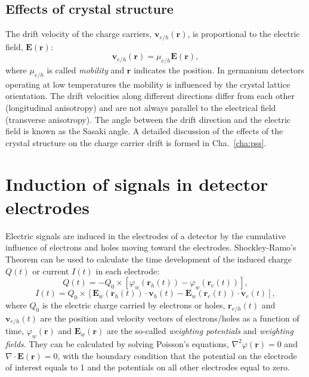 \subsection{Effects of crystal structure}
\label{sec:det:struc}
The drift velocity of the charge carriers, $\mathbf{v}_{e/h}(\mathbf{r})$, is proportional to the electric field, $\mathbf{E}(\mathbf{r})$:
\begin{equation} 
\label{eq:det:dv}
\mathbf{v}_{e/h} (\mathbf{r})= \mu_{e/h} \mathbf{E}(\mathbf{r}),
\end{equation}
where $\mu_{e/h}$ is called \emph{mobility} and $\mathbf{r}$ indicates the position. In germanium detectors operating at low temperatures the mobility is influenced by the crystal lattice orientation. The drift velocities along different directions differ from each other (longitudinal anisotropy) and are not always parallel to the electrical field (transverse anisotropy). The angle between the drift direction and the electric field is known as the Sasaki angle\cite{Sas56}. A detailed discussion of the effects of the crystal structure on the charge carrier drift is formed in Cha.~\ref{cha:pss}.

\section{Induction of signals in detector electrodes}
\label{sec:det:ramo}
Electric signals are induced in the electrodes of a detector by the cumulative influence of electrons and holes moving toward the electrodes. Shockley-Ramo's Theorem \cite{Gat82, Rad88, He00} can be used to calculate the time development of the induced charge $Q(t)$ or current $I(t)$ in each electrode:
\begin{equation} 
\label{eq:det:ramoq}
Q(t) = -Q_{0} \times [\varphi_{w}(\mathbf{r}_{h}(t)) - \varphi_{w}(\mathbf{r}_{e}(t))],
\end{equation}
\begin{equation} 
\label{eq:det:ramoi}
I(t) = Q_{0} \times [\mathbf{E}_{w}(\mathbf{r}_{h}(t)) \cdot \mathbf{v}_{h}(t) - \mathbf{E}_{w}(\mathbf{r}_{e}(t)) \cdot \mathbf{v}_{e}(t)],
\end{equation}
where $Q_{0}$ is the electric charge carried by electrons or holes, $\mathbf{r}_{e/h}(t)$ and $\mathbf{v}_{e/h}(t)$ are the position and velocity vectors of electrons/holes as a function of time, $\varphi_{w}(\mathbf{r})$ and $\mathbf{E}_{w}(\mathbf{r})$ are the so-called \emph{weighting potentials} and \emph{weighting fields}. They can be calculated by solving Poisson's equations, $\nabla^{2} \varphi(\mathbf{r}) = 0$ and $\nabla \cdot \mathbf{E}(\mathbf{r}) = 0$, with the boundary condition that the potential on the electrode of interest equals to 1 and the potentials on all other electrodes equal to zero.

